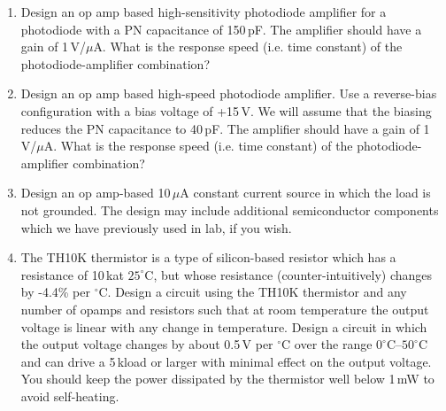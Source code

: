 \documentclass{article}
\begin{document}
\begin{enumerate}


\item Design an op amp based high-sensitivity photodiode amplifier for a photodiode with a PN capacitance of 150\,pF. The amplifier should have a gain of 1\,V/$\mu$A. What is the response speed (i.e. time constant) of the photodiode-amplifier combination?

\item Design an op amp based high-speed photodiode amplifier. Use a reverse-bias configuration with a bias voltage of +15\,V. We will assume that the biasing reduces the PN capacitance to 40\,pF. The amplifier should have a gain of 1\,V/$\mu$A. What is the response speed (i.e. time constant) of the photodiode-amplifier combination?

\item Design an op amp-based 10\,$\mu$A constant current source in which the load is not grounded. The design may include additional semiconductor components which we have previously used in lab, if you wish.

\item \label{ex:thermistor} The TH10K thermistor is a type of silicon-based resistor which has a resistance of 10\,k\Ohm at $25^\circ$C, but whose resistance (counter-intuitively) changes by -4.4\% per $^\circ$C. Design a circuit using the TH10K thermistor and any number of opamps and resistors such that at room temperature the output voltage is linear with any change in temperature. Design a circuit in which the output voltage changes by about 0.5\,V per $^\circ$C over the range $0^\circ\mbox{C}$--$50^\circ\mbox{C}$ and can drive a 5\,k\Ohm load or larger with minimal effect on the output voltage. You should keep the power dissipated by the thermistor well below 1\,mW to avoid self-heating.
\end{enumerate}
\end{document}
